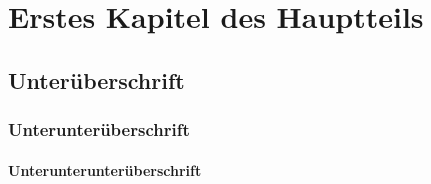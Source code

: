 \begingroup
\onehalfspacing




\chapter{Erstes Kapitel des Hauptteils}
 \section{Unterüberschrift}
  \subsection{Unterunterüberschrift}
   \subsubsection{Unterunterunterüberschrift}






\endgroup

